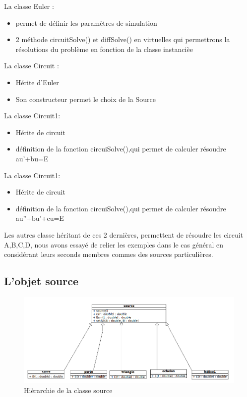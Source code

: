 \documentclass[a4paper,11pt]{article}
\begin{document}
\noindent La classe Euler :
\begin{itemize}
 \item permet de définir les paramètres de simulation
  \item 2 méthode circuitSolve() et diffSolve() en virtuelles qui permettrons la résolutions du problème en fonction de la classe instancièe
\end{itemize}
La classe Circuit :
\begin{itemize}
 \item Hérite d'Euler
  \item Son constructeur permet le choix de la Source 
\end{itemize}
La classe Circuit1:
\begin{itemize}
 \item Hérite de circuit
  \item définition de la fonction circuiSolve(),qui permet de calculer résoudre au'+bu=E  
\end{itemize}
La classe Circuit1:
\begin{itemize}
 \item Hérite de circuit
  \item définition de la fonction circuiSolve(),qui permet de calculer résoudre au''+bu'+cu=E  \\
\end{itemize}

\noindent Les autres classe héritant de ces 2 dernières, permettent de résoudre les circuit A,B,C,D, nous avons essayé de relier les exemples dans le cas général en considérant 
leurs seconds membres commes des sources particulières. \\

  \subsection{L'objet source}
    \begin{figure}[H]
	 \begin{center}
	\includegraphics[scale=.5]{sourceDiagram}
	\caption{Hièrarchie de la classe source}
	\end{center}
      \end{figure}
\end{document}
